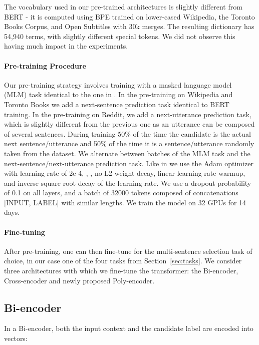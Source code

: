 \documentclass{article} \usepackage{iclr2020_conference,times}
\begin{document}
The vocabulary used in our pre-trained architectures is slightly different from BERT - it is computed using BPE trained on lower-cased Wikipedia, the Toronto Books Corpus, and Open Subtitles \citep{lison2016opensubtitles2016} with 30k merges. The resulting dictionary has 54,940 terms, with slightly different special tokens. We did not observe this having much impact in the experiments.
\fi 

\paragraph{Pre-training Procedure}
\label{pretraining}
Our pre-training strategy involves training with a masked language model (MLM) task identical to the one in \citet{devlin-etal-2019-bert}. In the pre-training on Wikipedia and Toronto Books we add a next-sentence prediction task identical to BERT training. In the pre-training on Reddit, we add a next-utterance prediction task, which is slightly different from the previous one as an utterance can be composed of several sentences. During training 50\% of the time the candidate is the actual next sentence/utterance and 50\% of the time it is a sentence/utterance randomly taken from the dataset. We alternate between batches of the MLM task and the next-sentence/next-utterance prediction task.
Like in \citet{lample2019cross} we use the Adam optimizer with learning rate of 2e-4, ,
, no L2 weight decay, linear learning
rate warmup, and inverse square root
decay of the learning rate. We use a dropout probability of 0.1 on all layers, and a batch of 32000 tokens composed of concatenations [INPUT, LABEL] with similar lengths. We train the model on 32 GPUs for 14 days.

\paragraph{Fine-tuning}
After pre-training, one can then fine-tune for the multi-sentence selection task of choice, in our case one of the four tasks 
from Section~\ref{sec:tasks}.
We consider three architectures with which we fine-tune the transformer:
the Bi-encoder, Cross-encoder and newly proposed Poly-encoder.



\subsection{Bi-encoder}
\label{subsection:Bi_Encoders}
In a Bi-encoder,
both the input context and the candidate label are encoded into vectors:
\end{document}
